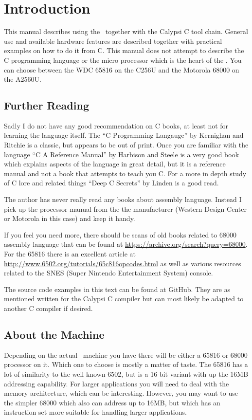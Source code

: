 \chapter{Introduction}

This manual describes using the \foenix\ together with the Calypsi C
tool chain. General use and available hardware features are described
together with practical examples on how to do it from C.
This manual does not attempt to describe the C programming language or
the micro processor which is the heart of the \foenix. You can choose
between the WDC 65816 on the C256U and the Motorola 68000 on the A2560U.

\section*{Further Reading}

Sadly I do not have any good recommendation on C books, at least not
for learning the language itself. The ``C Programming Langauge'' by
Kernighan and Ritchie is a classic, but appears to be out of print.
Once you are familiar with the language ``C A Reference Manual'' by
Harbison and Steele is a very good book which explains aspects of the
language in great detail, but it is a reference manual and not a book
that attempts to teach you C.
For a more in depth study of C lore and related things ``Deep C
Secrets'' by Linden is a good read.

The author has never really read any books about assembly
language. Instead I pick up the processor manual from the the
manufacturer (Western Design Center or Motorola in this case) and keep
it handy.

If you feel you need more, there should be scans of old books related
to 68000 assembly language that can be found at
\url{https://archive.org/search?query=68000}.
For the 65816 there is an excellent article at
\url{http://www.6502.org/tutorials/65c816opcodes.html} as well as
various resources related to the SNES (Super Nintendo Entertainment
System) console.

The source code examples in this text can be found at GitHub. They are
as mentioned written for the Calypsi C compiler but can most likely be
adapted to another C compiler if desired.

\section*{About the Machine}

Depending on the actual \foenix\ machine you have there will be either
a 65816 or 68000 processor on it. Which one to choose is mostly a
matter of taste. The 65816 has a lot of similarity to the well known
6502, but is a 16-bit variant with up the 16MB addressing
capability. For larger applications you will need to deal with the
memory architecture, which can be interesting. However, you may want
to use the simpler 68000 which also can address up to 16MB, but which
has an instruction set more suitable for handling larger applications.

